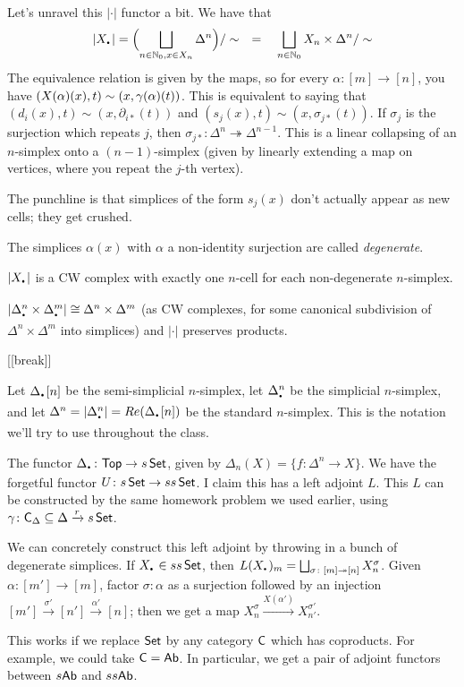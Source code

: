 Let's unravel this $|\cdot|$ functor a bit. We have that
\[
 |X_\udot| = \Bigl(\bigsqcup_{n\in \NN_0, x\in X_n} \Delta^n\Bigr)/\sim \quad =\quad \bigsqcup_{n\in \NN_0} X_n\times \Delta^n /\sim
\]
The equivalence relation is given by the maps, so for every $\alpha\colon [m]\to [n]$, you have $(X(\alpha)(x),t)\sim (x,\gamma(\alpha)(t))$. This is equivalent to saying that $(d_i(x),t)\sim (x,\partial_{i*}(t))$ and $(s_j(x),t)\sim (x,\sigma_{j*}(t))$. If $\sigma_j$ is the surjection which repeats $j$, then $\sigma_{j*}\colon \Delta^n\twoheadrightarrow \Delta^{n-1}$. This is a linear collapsing of an $n$-simplex onto a $(n-1)$-simplex (given by linearly extending a map on vertices, where you repeat the $j$-th vertex).

The punchline is that simplices of the form $s_j(x)$ don't actually appear as new cells; they get crushed.
\begin{definition}
 The simplices $\alpha(x)$ with $\alpha$ a non-identity surjection are called \emph{degenerate}.
\end{definition}
\begin{theorem}
 $|X_\udot|$ is a CW complex with exactly one $n$-cell for each non-degenerate $n$-simplex. 
\end{theorem}
\begin{corollary}
 $|\Delta^n_\udot\times \Delta_\udot^m|\cong \Delta^n\times \Delta^m$ (as CW complexes, for some canonical subdivision of $\Delta^n\times \Delta^m$ into simplices) and $|\cdot|$ preserves products.
\end{corollary}

[[break]]

Let $\Delta_\udot[n]$ be the semi-simplicial $n$-simplex, let $\Delta^n_\udot$ be the simplicial $n$-simplex, and let $\Delta^n = |\Delta_\udot^n|=Re(\Delta_\udot[n])$ be the standard $n$-simplex. This is the notation we'll try to use throughout the class.

The functor $\Delta_\udot\colon \top\to s\set$, given by $\Delta_n(X)=\{f\colon \Delta^n\to X\}$. We have the forgetful functor $U\colon s\operatorname{\sf Set}\to ss\operatorname{\sf Set}$. I claim this has a left adjoint $L$. This $L$ can be constructed by the same homework problem we used earlier, using $\gamma\colon \text{\sf C}_\Delta\subseteq \Delta\xrightarrow r s\operatorname{\sf Set}$.

We can concretely construct this left adjoint by throwing in a bunch of degenerate simplices. If $X_\udot \in ss\set$, then $L(X_\udot)_m = \bigsqcup_{\sigma\colon [m]\twoheadrightarrow [n]} X_n^{\sigma}$. Given $\alpha\colon [m']\to [m]$, factor $\sigma\colon \alpha$ as a surjection followed by an injection $[m']\xrightarrow{\sigma'} [n']\xrightarrow{\alpha'} [n]$; then we get a map $X_n^\sigma\xrightarrow{X(\alpha')} X_{n'}^{\sigma'}$.
\begin{remark}
 This works if we replace $\operatorname{\sf Set}$ by any category $\text{\sf C}$ which has coproducts. For example, we could take $\text{\sf C}=\text{\sf Ab}$. In particular, we get a pair of adjoint functors between $s\text{\sf Ab}$ and $ss\text{\sf Ab}$.
\end{remark}

